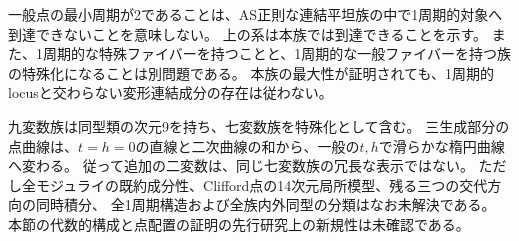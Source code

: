 \begin{remark}[非1周期性と変形連結性]
一般点の最小周期が2であることは、AS正則な連結平坦族の中で1周期的対象へ到達できないことを意味しない。
上の系は本族では到達できることを示す。
また、1周期的な特殊ファイバーを持つことと、1周期的な一般ファイバーを持つ族の特殊化になることは別問題である。
本族の最大性が証明されても、1周期的locusと交わらない変形連結成分の存在は従わない。
\end{remark}

\begin{remark}[確定範囲]
九変数族は同型類の次元9を持ち、七変数族を特殊化として含む。
三生成部分の点曲線は、$t=h=0$の直線と二次曲線の和から、一般の$t,h$で滑らかな楕円曲線へ変わる。
従って追加の二変数は、同じ七変数族の冗長な表示ではない。
ただし全モジュライの既約成分性、Clifford点の14次元局所模型、残る三つの交代方向の同時積分、
全1周期構造および全族内外同型の分類はなお未解決である。
本節の代数的構成と点配置の証明の先行研究上の新規性は未確認である。
\end{remark}
